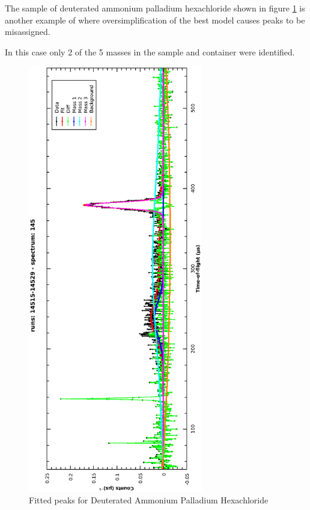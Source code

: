 \documentclass[a4paper]{article}
\begin{document}
The sample of deuterated ammonium palladium hexachloride shown in figure
\ref{fig:model_sel_deut-amm-pall-hexc} is another example of where
oversimplification of the best model causes peaks to be misassigned.

In this case only 2 of the 5 masses in the sample and container were identified.

\begin{figure}[h!]
  \centering
  \vspace{-60pt}
  \begin{turn}{-90}
    \includegraphics[width=0.68\textwidth]{graphics/model_sel_deut-amm-pall-hexc.eps}
  \end{turn}
  \vspace{-60pt}
  \caption{Fitted peaks for Deuterated Ammonium Palladium Hexachloride}
  \label{fig:model_sel_deut-amm-pall-hexc}
\end{figure}
\FloatBarrier
\end{document}
